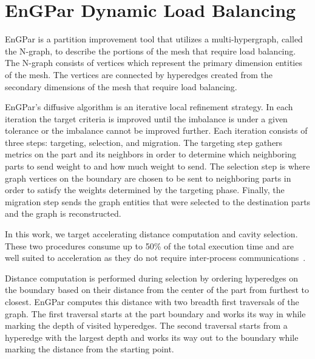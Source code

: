 \documentclass[graybox]{svmult}
\begin{document}
\section{EnGPar Dynamic Load Balancing} \label{sec:engpar}


EnGPar is a partition improvement tool that utilizes a multi-hypergraph,
called the N-graph, to describe the portions of the mesh that require load balancing.
The N-graph consists of vertices which represent the primary dimension entities of the
mesh. The vertices are connected by hyperedges created from the secondary dimensions of
the mesh that require load balancing.

EnGPar's diffusive algorithm is an iterative local refinement strategy.
In each iteration the target criteria is improved until the imbalance is under a
given tolerance or the imbalance cannot be improved further.
Each iteration consists of three steps: targeting, selection, and migration.
The targeting step gathers metrics on the part and its neighbors
in order to determine which neighboring parts to send weight to and how much
weight to send.
The selection step is where graph vertices on the boundary are chosen to be sent
to neighboring parts in order to satisfy the weights determined by the targeting
phase.
Finally, the migration step sends the graph entities that were selected to the
destination parts and the graph is reconstructed.

In this work, we target accelerating distance computation and cavity selection.
These two procedures consume up to 50\% of the total execution time and are well
suited to acceleration as they do not require inter-process communications~\cite{engparSC17}.

Distance computation is performed during selection by ordering hyperedges on the
boundary based on their distance from the center of the part from furthest to
closest.
EnGPar computes this distance with two breadth first traversals of the graph.
The first traversal starts at the part boundary and works its way in while
marking the depth of visited hyperedges.
The second traversal starts from a hyperedge with the largest depth and works
its way out to the boundary while marking the distance from the starting point.
\end{document}
